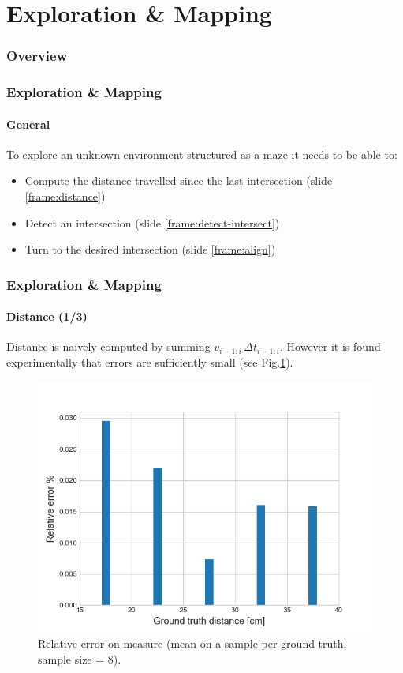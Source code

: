 \documentclass[10pt]{beamer}
\begin{document}
\section{Exploration \& Mapping} 

\begin{frame}
\frametitle{Overview}
\tableofcontents[currentsection,subsectionstyle=shaded]
\end{frame}

\begin{frame}
\frametitle{Exploration \& Mapping}
\framesubtitle{General}
To explore an unknown environment structured as a maze it needs to be able to:
\begin{itemize}
\item Compute the distance travelled since the last intersection (slide \ref{frame:distance})
\item Detect an intersection (slide \ref{frame:detect-intersect})
\item Turn to the desired intersection (slide \ref{frame:align})
\end{itemize}
\end{frame}


\begin{frame}[label={frame:distance}]
\frametitle{Exploration \& Mapping}
\framesubtitle{Distance (1/3)}
Distance is naively computed by summing $v_{i-1:i}\,\Delta t_{i-1:i}$. However it is found experimentally that errors are sufficiently small (see Fig.\ref{fig:hist-dist}).
\begin{figure}[hbtp]
\centering
\includegraphics[scale=0.45]{figures/hist-distance.png}
\caption{Relative error on measure (mean on a sample per ground truth, sample size = 8).}
\label{fig:hist-dist}
\end{figure}
\end{frame}
\end{document}
